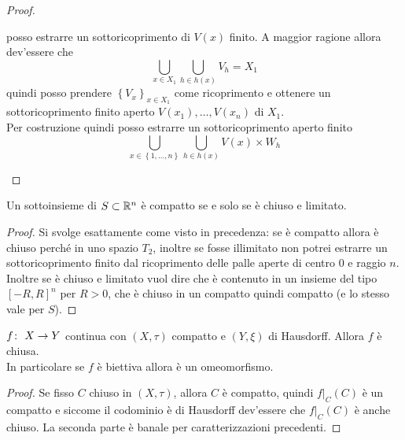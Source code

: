 \begin{proof}
\begin{enumerate}
		posso estrarre un sottoricoprimento di $V(x)$ finito. A maggior ragione allora dev'essere che 
		\begin{equation*}
			\bigcup_{x \in X_1} \bigcup_{h \in h(x)} V_h = X_1
		\end{equation*} 
		quindi posso prendere $\left\{V_x\right\}_{x \in X_1}$ come ricoprimento e ottenere un sottoricoprimento finito aperto $V(x_1), \dots, V(x_n)$ di $X_1$. \\
		Per costruzione quindi posso estrarre un sottoricoprimento aperto finito  
		\begin{equation*}
			\bigcup_{x \in \left\{1,\dots, n\right\}} \bigcup_{h \in h(x)} V(x) \times W_h
		\end{equation*}
	\end{enumerate}
\end{proof}

\begin{corollary}
	Un sottoinsieme di $S \subset \mathbb{R}^n$ è compatto se e solo se è chiuso e limitato. 
\end{corollary} 
\begin{proof}
	Si svolge esattamente come visto in precedenza: se è compatto allora è chiuso perché in uno spazio $T_2$, inoltre se fosse illimitato non potrei estrarre un sottoricoprimento finito dal ricoprimento delle palle aperte di centro $0$ e raggio $n$. \\ Inoltre se è chiuso e limitato vuol dire che è contenuto in un insieme del tipo $[-R,R]^n$ per $R>0$, che è chiuso in un compatto quindi compatto (e lo stesso vale per $S$).
\end{proof}

\begin{theorem}
	$f \colon\ X \rightarrow Y$ continua con $(X, \tau)$ compatto e $(Y, \xi)$ di Hausdorff. Allora $f$ è chiusa. \\ In particolare se $f$ è biettiva allora è un omeomorfismo. 
\end{theorem} 
\begin{proof}
	Se fisso $C$ chiuso in $(X,\tau)$, allora $C$ è compatto, quindi $f|_C(C)$ è un compatto e siccome il codominio è di Hausdorff dev'essere che $f|_C(C)$ è anche chiuso. La seconda parte è banale per caratterizzazioni precedenti.
\end{proof}

